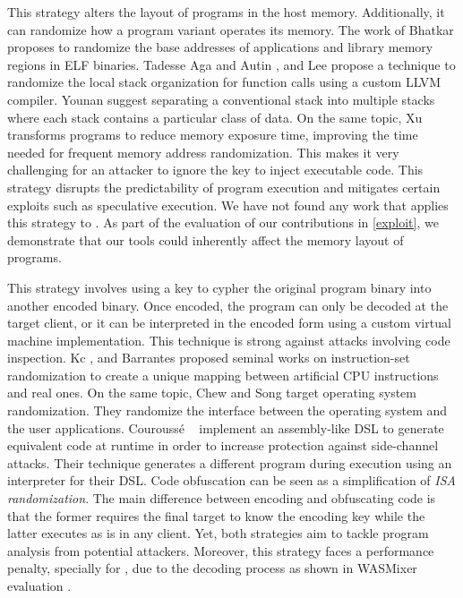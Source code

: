 This strategy alters the layout of programs in the host memory. 
Additionally, it can randomize how a program variant operates its memory. 
The work of Bhatkar \etal \cite{bhatkar03, bhatkar2005efficient} proposes to randomize the base addresses of applications and library memory regions in ELF binaries. 
Tadesse Aga and Autin \cite{aga2019smokestack}, and Lee \etal \cite{lee2021savior} propose a technique to randomize the local stack organization for function calls using a custom LLVM compiler.
Younan \etal \cite{Younan2006} suggest separating a conventional stack into multiple stacks where each stack contains a particular class of data. 
On the same topic, Xu \etal \cite{xu2020merr} transforms programs to reduce memory exposure time, improving the time needed for frequent memory address randomization. 
This makes it very challenging for an attacker to ignore the key to inject executable code. 
This strategy disrupts the predictability of program execution and mitigates certain exploits such as speculative execution. 
We have not found any work that applies this strategy to \Wasm.
As part of the evaluation of our contributions in \autoref{exploit}, we demonstrate that our tools could inherently affect the memory layout of \Wasm programs.

This strategy involves using a key to cypher the original program binary into another encoded binary. 
Once encoded, the program can only be decoded at the target client, or it can be interpreted in the encoded form using a custom virtual machine implementation. 
This technique is strong against attacks involving code inspection. 
Kc \etal \cite{Kc03}, and Barrantes \etal \cite{barrantes2003randomized} proposed seminal works on instruction-set randomization 
to create a unique mapping between artificial CPU instructions and real ones.
On the same topic, Chew and Song \cite{Chew02mitigatingbuffer} target operating system randomization. They randomize the interface between the operating system and the user applications.
Courouss{\'e} \etal~\cite{courousse2016runtime} implement an assembly-like DSL to generate equivalent code at runtime in order to increase protection against side-channel attacks. Their technique generates a different program during execution using an interpreter for their DSL.
Code obfuscation \cite{wobfuscator} can be seen as a simplification of \emph{ISA randomization}. 
The main difference between encoding and obfuscating code is that the former requires the final target to know the encoding key while the latter executes as is in any client. 
Yet, both strategies aim to tackle program analysis from potential attackers. 
Moreover, this strategy faces a performance penalty, specially for \Wasm, due to the decoding process as shown in WASMixer evaluation \cite{wasmixer}.


